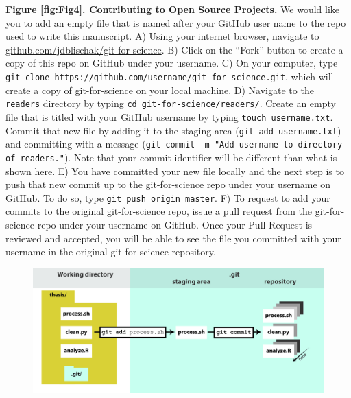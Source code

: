 \documentclass[10pt]{article}
\begin{document}
\textbf{Figure \ref{fig:Fig4}. Contributing to Open Source Projects.}
We would like you to add an empty file that is named after your GitHub user name to the repo used to write this manuscript.
A) Using your internet browser, navigate to \href{https://github.com/jdblischak/git-for-science}{github.com/jdblischak/git-for-science}.
B) Click on the ``Fork'' button to create a copy of this repo on GitHub under your username.
C) On your computer, type \verb|git clone https://github.com/username/git-for-science.git|, which will create a copy of git-for-science on your local machine.
D) Navigate to the \verb|readers| directory by typing \verb|cd git-for-science/readers/|.
Create an empty file that is titled with your GitHub username by typing \verb|touch username.txt|.
Commit that new file by adding it to the staging area (\verb|git add username.txt|) and committing with a message (\verb|git commit -m "Add username to directory of readers."|).
Note that your commit identifier will be different than what is shown here.
E) You have committed your new file locally and the next step is to push that new commit up to the git-for-science repo under your username on GitHub.
To do so, type \verb|git push origin master|.
F) To request to add your commits to the original git-for-science repo, issue a pull request from the git-for-science repo under your username on GitHub.
Once your Pull Request is reviewed and accepted, you will be able to see the file you committed with your username in the original git-for-science repository.








\begin{figure}[h!]
\begin{center}
\includegraphics[width=1\columnwidth]{figures/Fig1/Fig1.png}
\caption{\textbf{\label{fig:Fig1}}%
}
\end{center}
\end{figure}
\end{document}
